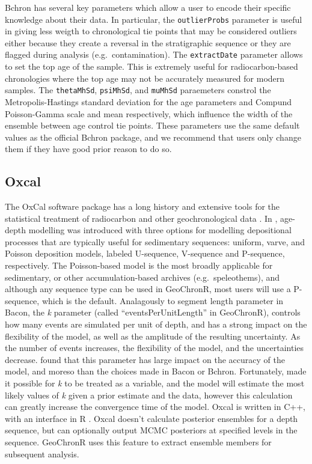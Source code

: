 \documentclass[gchron, manuscript]{copernicus}
\begin{document}
Bchron has several key parameters which allow a user to encode their specific knowledge about their data.
In particular, the \texttt{outlierProbs} parameter is useful in giving less weigth to chronological tie points that may be considered outliers either because they create a reversal in the stratigraphic sequence or they are flagged during analysis (e.g.~contamination).
The \texttt{extractDate} parameter allows to set the top age of the sample.
This is extremely useful for radiocarbon-based chronologies where the top age may not be accurately measured for modern samples.
The \texttt{thetaMhSd}, \texttt{psiMhSd}, and \texttt{muMhSd} paraemeters constrol the Metropolis-Hastings standard deviation for the age parameters and Compund Poisson-Gamma scale and mean respectively, which influence the width of the ensemble between age control tie points.
These parameters use the same default values as the official Bchron package, and we recommend that users only change them if they have good prior reason to do so.

\subsection{Oxcal}

The OxCal software package has a long history and extensive tools for the statistical treatment of radiocarbon and other geochronological data \citep{BronkRamsey95}.
In \citet{ramsey2008deposition}, age-depth modelling was introduced with three options for modelling depositional processes that are typically useful for sedimentary sequences: uniform, varve, and Poisson deposition models, labeled U-sequence, V-sequence and P-sequence, respectively.
The Poisson-based model is the most broadly applicable for sedimentary, or other accumulation-based archives (e.g.~speleothems), and although any sequence type can be used in GeoChronR, most users will use a P-sequence, which is the default.
Analagously to segment length parameter in Bacon, the \emph{k} parameter (called ``eventsPerUnitLength'' in GeoChronR), controls how many events are simulated per unit of depth, and has a strong impact on the flexibility of the model, as well as the amplitude of the resulting uncertainty.
As the number of events increases, the flexibility of the model, and the uncertainties decrease.
\citet{trachsel2017} found that this parameter has large impact on the accuracy of the model, and moreso than the choices made in Bacon or Bchron.
Fortunately, \citet{bronkramsey2010} made it possible for \emph{k} to be treated as a variable, and the model will estimate the most likely values of \emph{k} given a prior estimate and the data, however this calculation can greatly increase the convergence time of the model.
Oxcal is written in C++, with an interface in R \citep{oxcAAR}.
Oxcal doesn't calculate posterior ensembles for a depth sequence, but can optionally output MCMC posteriors at specified levels in the sequence.
GeoChronR uses this feature to extract ensemble members for subsequent analysis.
\end{document}
